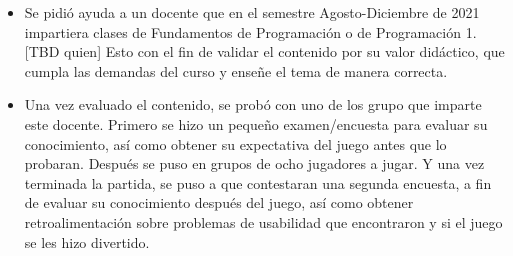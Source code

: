 \begin{itemize}
    \item Se pidió ayuda a un docente que en el semestre Agosto-Diciembre de 2021 impartiera clases de Fundamentos de Programación o de Programación 1. [TBD quien] Esto con el fin de validar el contenido por su valor didáctico, que cumpla las demandas del curso y enseñe el tema de manera correcta.
    \item Una vez evaluado el contenido, se probó con uno de los grupo que imparte este docente. Primero se hizo un pequeño examen/encuesta para evaluar su conocimiento, así como obtener su expectativa del juego antes que lo probaran. Después se puso en grupos de ocho jugadores a jugar. Y una vez terminada la partida, se puso a que contestaran una segunda encuesta, a fin de evaluar su conocimiento después del juego, así como obtener retroalimentación sobre problemas de usabilidad que encontraron y si el juego se les hizo divertido.
\end{itemize}

